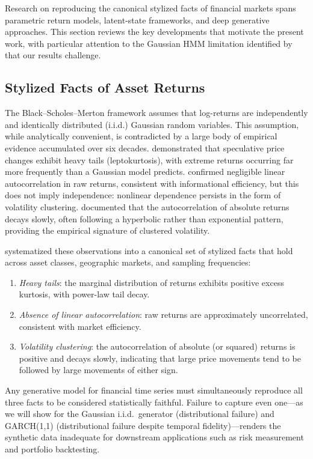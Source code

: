 Research on reproducing the canonical stylized facts of financial markets spans parametric return models, latent-state frameworks, and deep generative approaches.
This section reviews the key developments that motivate the present work, with particular attention to the Gaussian HMM limitation identified by \citet{ryden1998stylized} that our results challenge.

\subsection{Stylized Facts of Asset Returns}

The Black--Scholes--Merton framework \citep{black1973pricing} assumes that log-returns are independently and identically distributed (i.i.d.) Gaussian random variables.
This assumption, while analytically convenient, is contradicted by a large body of empirical evidence accumulated over six decades.
\citet{mandelbrot1963variation} demonstrated that speculative price changes exhibit heavy tails (leptokurtosis), with extreme returns occurring far more frequently than a Gaussian model predicts.
\citet{fama1970efficient} confirmed negligible linear autocorrelation in raw returns, consistent with informational efficiency, but this does not imply independence: nonlinear dependence persists in the form of volatility clustering.
\citet{schwert1989does} documented that the autocorrelation of absolute returns decays slowly, often following a hyperbolic rather than exponential pattern, providing the empirical signature of clustered volatility.

\citet{cont2001empirical} systematized these observations into a canonical set of stylized facts that hold across asset classes, geographic markets, and sampling frequencies:
\begin{enumerate}
    \item \textit{Heavy tails}: the marginal distribution of returns exhibits positive excess kurtosis, with power-law tail decay.
    \item \textit{Absence of linear autocorrelation}: raw returns are approximately uncorrelated, consistent with market efficiency.
    \item \textit{Volatility clustering}: the autocorrelation of absolute (or squared) returns is positive and decays slowly, indicating that large price movements tend to be followed by large movements of either sign.
\end{enumerate}
Any generative model for financial time series must simultaneously reproduce all three facts to be considered statistically faithful.
Failure to capture even one---as we will show for the Gaussian i.i.d.\ generator (distributional failure) and GARCH(1,1) (distributional failure despite temporal fidelity)---renders the synthetic data inadequate for downstream applications such as risk measurement and portfolio backtesting.

